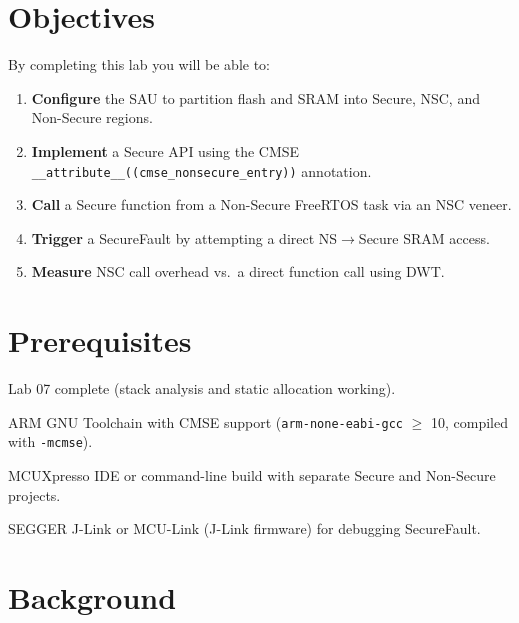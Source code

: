 \documentclass[11pt, a4paper]{article}
\begin{document}

\section{Objectives}

By completing this lab you will be able to:

\begin{enumerate}[noitemsep, leftmargin=*]
  \item \textbf{Configure} the SAU to partition flash and SRAM into Secure, NSC, and
        Non-Secure regions.
  \item \textbf{Implement} a Secure API using the CMSE
        \texttt{\_\_attribute\_\_((cmse\_nonsecure\_entry))} annotation.
  \item \textbf{Call} a Secure function from a Non-Secure FreeRTOS task via an NSC veneer.
  \item \textbf{Trigger} a SecureFault by attempting a direct NS$\to$Secure SRAM access.
  \item \textbf{Measure} NSC call overhead vs.\ a direct function call using DWT.
\end{enumerate}

\section{Prerequisites}

\begin{checklist}
  \item Lab 07 complete (stack analysis and static allocation working).
  \item ARM GNU Toolchain with CMSE support (\texttt{arm-none-eabi-gcc} $\geq$ 10,
        compiled with \texttt{-mcmse}).
  \item MCUXpresso IDE or command-line build with separate Secure and Non-Secure projects.
  \item SEGGER J-Link or MCU-Link (J-Link firmware) for debugging SecureFault.
\end{checklist}

\section{Background}
\end{document}

